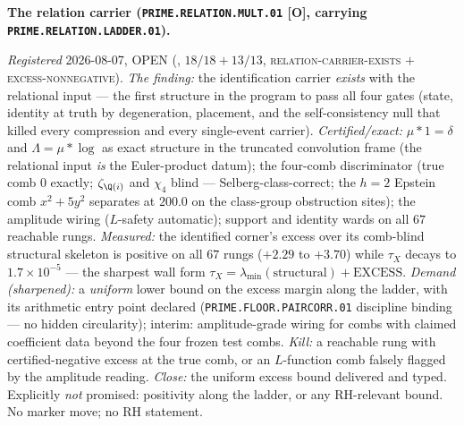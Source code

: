 \par\smallskip\noindent\textbf{The relation carrier
(\texttt{PRIME.RELATION.MULT.01} [O], carrying
\texttt{PRIME.RELATION.LADDER.01}).}
{\sloppy
\emph{Registered} 2026-08-07, OPEN
(, $18/18 + 13/13$,
\textsc{relation-carrier-exists} $+$ \textsc{excess-nonnegative}).
\emph{The finding:} the identification carrier \emph{exists} with
the relational input --- the first structure in the program to
pass all four gates (state, identity at truth by degeneration,
placement, and the self-consistency null that killed every
compression and every single-event carrier).
\emph{Certified/exact:} $\mu * 1 = \delta$ and
$\Lambda = \mu * \log$ as exact structure in the truncated
convolution frame (the relational input \emph{is} the
Euler-product datum); the four-comb discriminator (true comb $0$
exactly; $\zeta_{\Q(i)}$ and $\chi_4$ blind ---
Selberg-class-correct; the $h = 2$ Epstein comb $x^2 + 5y^2$
separates at $200.0$ on the class-group obstruction sites); the
amplitude wiring ($L$-safety automatic); support and identity
wards on all $67$ reachable rungs.  \emph{Measured:} the
identified corner's excess over its comb-blind structural
skeleton is positive on all $67$ rungs ($+2.29$ to $+3.70$) while
$\tau_X$ decays to $1.7\times10^{-5}$ --- the sharpest wall form
$\tau_X = \lambda_{\min}(\text{structural}) + \text{EXCESS}$.
\emph{Demand (sharpened):} a \emph{uniform} lower bound on the
excess margin along the ladder, with its arithmetic entry point
declared (\texttt{PRIME.FLOOR.PAIRCORR.01} discipline binding ---
no hidden circularity); interim: amplitude-grade wiring for combs
with claimed coefficient data beyond the four frozen test combs.
\emph{Kill:} a reachable rung with certified-negative excess at
the true comb, or an $L$-function comb falsely flagged by the
amplitude reading.  \emph{Close:} the uniform excess bound
delivered and typed.  Explicitly \emph{not} promised: positivity
along the ladder, or any RH-relevant bound.  No marker move; no
RH statement.\par}


